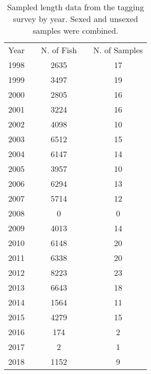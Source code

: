 \begingroup\fontsize{10}{12}\selectfont
\begingroup\fontsize{10}{12}\selectfont


\begin{table}[]
\caption{Sampled length data from the tagging survey by year. Sexed and unsexed samples were combined.}
\label{tab:survey_sample_indices}
\begin{tabular}{ccccc}
\multicolumn{1}{l}{Year} & \multicolumn{1}{l}{} & \multicolumn{1}{l}{N. of Fish} & \multicolumn{1}{l}{} & \multicolumn{1}{l}{N. of Samples} \\
1998 &  & 2635 &  & 17 \\
1999 &  & 3497 &  & 19 \\
2000 &  & 2805 &  & 16 \\
2001 &  & 3224 &  & 16 \\
2002 &  & 4098 &  & 10 \\
2003 &  & 6512 &  & 15 \\
2004 &  & 6147 &  & 14 \\
2005 &  & 3957 &  & 10 \\
2006 &  & 6294 &  & 13 \\
2007 &  & 5714 &  & 12 \\
2008 &  & 0 &  & 0 \\
2009 &  & 4013 &  & 14 \\
2010 &  & 6148 &  & 20 \\
2011 &  & 6338 &  & 20 \\
2012 &  & 8223 &  & 23 \\
2013 &  & 6643 &  & 18 \\
2014 &  & 1564 &  & 11 \\
2015 &  & 4279 &  & 15 \\
2016 &  & 174 &  & 2 \\
2017 &  & 2 &  & 1 \\
2018 &  & 1152 &  & 9 \\ \hline
\end{tabular}
\end{table}
\endgroup{}
\endgroup{}
